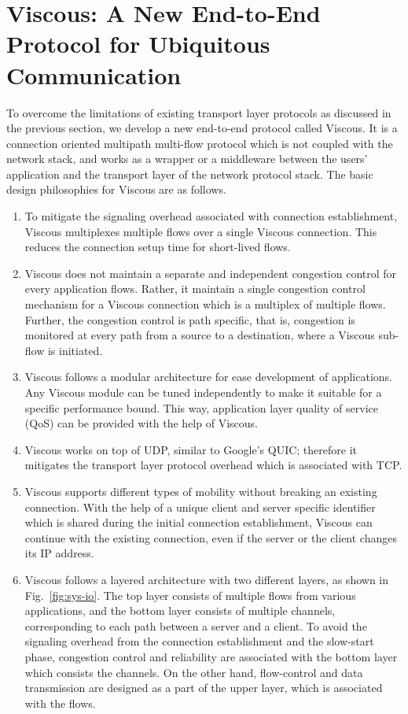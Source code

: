 \section{Viscous: A New End-to-End Protocol for Ubiquitous Communication}
To overcome the limitations of existing transport layer protocols as discussed in the previous section, we develop a new end-to-end protocol called Viscous. It is a connection oriented multipath multi-flow protocol which is not coupled with the network stack, and works as a wrapper or a middleware between the users' application and the transport layer of the network protocol stack. The basic design philosophies for Viscous are as follows. 
\begin{enumerate}
	\item To mitigate the signaling overhead associated with connection establishment, Viscous multiplexes multiple flows over a single Viscous connection. This reduces the connection setup time for short-lived flows. 
	\item Viscous does not maintain a separate and independent congestion control for every application flows. Rather, it maintain a single congestion control mechanism for a Viscous connection which is a multiplex of multiple flows. Further, the congestion control is path specific, that is, congestion is monitored at every path from a source to a destination, where a Viscous sub-flow is initiated.  
	\item Viscous follows a modular architecture for ease development of applications. Any Viscous module can be tuned independently to make it suitable for a specific performance bound. This way, application layer quality of service (QoS) can be provided with the help of Viscous. 
	\item Viscous works on top of UDP, similar to Google's QUIC; therefore it mitigates the transport layer protocol overhead which is associated with TCP. 
	\item Viscous supports different types of mobility without breaking an existing connection. With the help of a unique client and server specific identifier which is shared during the initial connection establishment, Viscous can continue with the existing connection, even if the server or the client changes its IP address.   
	\item Viscous follows a layered architecture with two different layers, as shown in Fig.~\ref{fig:sys-io}. The top layer consists of multiple flows from various applications, and the bottom layer consists of multiple channels, corresponding to each path between a server and a client. To avoid the signaling overhead from the connection establishment and the slow-start phase, congestion control and reliability are associated with the bottom layer which consists the channels. On the other hand, flow-control and data transmission are designed as a part of the upper layer, which is associated with the flows.

\end{enumerate}
